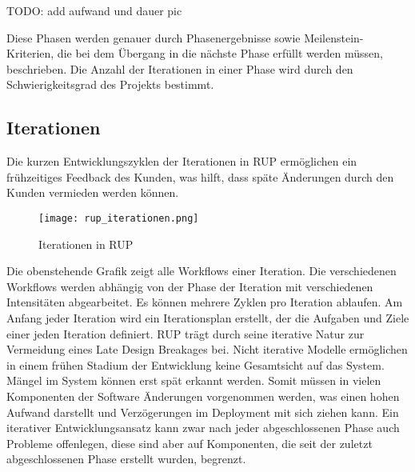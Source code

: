 	TODO: add aufwand und dauer pic
	
	Diese Phasen werden genauer durch Phasenergebnisse sowie Meilenstein-Kriterien, die bei dem Übergang in die nächste Phase erfüllt werden müssen, beschrieben.
Die Anzahl der Iterationen in einer Phase wird durch den Schwierigkeitsgrad des Projekts bestimmt. 

  \subsection{Iterationen}
  
  Die kurzen Entwicklungszyklen der Iterationen in RUP ermöglichen ein frühzeitiges Feedback des Kunden, was hilft, dass späte Änderungen durch den Kunden vermieden werden können. 
  
  \begin{center}
			\begin{figure}[h]
   		\centering
    	\texttt{[image: rup\_iterationen.png]}
		   \caption{Iterationen in RUP}
			\end{figure}
		\end{center}
  
  Die obenstehende Grafik zeigt alle Workflows einer Iteration. Die verschiedenen Workflows werden abhängig von der Phase der Iteration mit verschiedenen Intensitäten abgearbeitet. 
Es können mehrere Zyklen pro Iteration ablaufen.
Am Anfang jeder Iteration wird ein Iterationsplan erstellt, der die Aufgaben und Ziele einer jeden Iteration definiert. 
RUP trägt durch seine iterative Natur zur Vermeidung eines Late Design Breakages bei. Nicht iterative Modelle ermöglichen in einem frühen Stadium der Entwicklung keine Gesamtsicht auf das System. Mängel im System können erst spät erkannt werden. Somit müssen in vielen Komponenten der Software Änderungen vorgenommen werden, was einen hohen Aufwand darstellt und Verzögerungen im Deployment mit sich ziehen kann. 
Ein iterativer Entwicklungsansatz kann zwar nach jeder abgeschlossenen Phase auch Probleme offenlegen, diese sind aber auf Komponenten, die seit der zuletzt abgeschlossenen Phase erstellt wurden, begrenzt.


